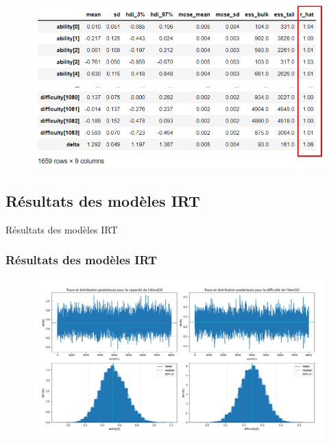 \documentclass[aspectratio=169,professionalfonts, 12pt]{beamer}
\begin{document}
\begin{frame}
  \justifying 
  \begin{minipage}{\textwidth}
    \begin{figure}[H]
      \begin{center}
        \includegraphics[width=\textwidth]{images/contribution/output_of_rhat.png}
      \end{center}
    \end{figure}
  \end{minipage}
\end{frame}


\subsection{Résultats des modèles IRT}

\begin{frame}
  \justifying 
  \begin{minipage}{\textwidth}
    \begin{center}
      \huge Résultats des modèles IRT
    \end{center}
  \end{minipage}
\end{frame}

\begin{frame}
  \frametitle{Résultats des modèles IRT}
  \justifying 
  \begin{minipage}{\textwidth} 
  \begin{figure}[H]
    \begin{center}
      \includegraphics[scale=0.3]{images/contribution/params_posterior_distribution.png}
    \end{center}
  \end{figure}
  \end{minipage}
\end{frame}
\end{document}

